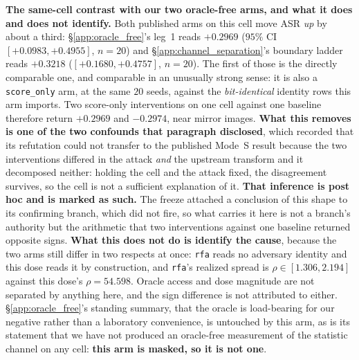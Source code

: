\documentclass{article}
\begin{document}
\textbf{The same-cell contrast with our two oracle-free arms, and what it does and does not identify.} Both published arms on this cell move ASR \emph{up} by about a third: §\ref{app:oracle_free}'s leg~1 reads $+0.2969$ ($95\%$ CI $[+0.0983,+0.4955]$, $n{=}20$) and §\ref{app:channel_separation}'s boundary ladder reads $+0.3218$ ($[+0.1680,+0.4757]$, $n{=}20$). The first of those is the directly comparable one, and comparable in an unusually strong sense: it is also a \texttt{score\_only} arm, at the same $20$ seeds, against the \emph{bit-identical} identity rows this arm imports. Two score-only interventions on one cell against one baseline therefore return $+0.2969$ and $-0.2974$, near mirror images. \textbf{What this removes is one of the two confounds that paragraph disclosed}, which recorded that its refutation could not transfer to the published Mode~S result because the two interventions differed in the attack \emph{and} the upstream transform and it decomposed neither: holding the cell and the attack fixed, the disagreement survives, so the cell is not a sufficient explanation of it. \textbf{That inference is post hoc and is marked as such.} The freeze attached a conclusion of this shape to its confirming branch, which did not fire, so what carries it here is not a branch's authority but the arithmetic that two interventions against one baseline returned opposite signs. \textbf{What this does not do is identify the cause}, because the two arms still differ in two respects at once: \texttt{rfa} reads no adversary identity and this dose reads it by construction, and \texttt{rfa}'s realized spread is $\rho \in [1.306,2.194]$ against this dose's $\rho{=}54.598$. Oracle access and dose magnitude are not separated by anything here, and the sign difference is not attributed to either. §\ref{app:oracle_free}'s standing summary, that the oracle is load-bearing for our negative rather than a laboratory convenience, is untouched by this arm, as is its statement that we have not produced an oracle-free measurement of the statistic channel on any cell: \textbf{this arm is masked, so it is not one}.
\end{document}
